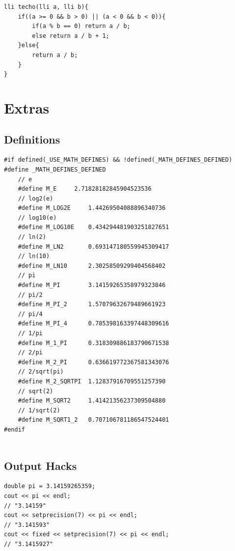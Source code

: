 \documentclass[twoside]{article}
\begin{document}
\begin{multicols*}{2}
\begin{verbatim}
\end{verbatim}
\vspace{-12pt}
\begin{verbatim}
lli techo(lli a, lli b){
	if((a >= 0 && b > 0) || (a < 0 && b < 0)){
		if(a % b == 0) return a / b;
		else return a / b + 1;
	}else{
		return a / b;
	}
}

\end{verbatim}

\sectionfont{\bfseries\sffamily\centering\Huge}
\vspace{1em}
\section*{Extras}
\vspace{3em}
\subsectionfont{\large\bfseries\sffamily\underline}
\subsection*{Definitions}
\begin{verbatim}
#if defined(_USE_MATH_DEFINES) && !defined(_MATH_DEFINES_DEFINED)
#define _MATH_DEFINES_DEFINED
	// e
	#define M_E		2.71828182845904523536
	// log2(e)
	#define M_LOG2E		1.44269504088896340736
	// log10(e)
	#define M_LOG10E	0.434294481903251827651
	// ln(2)
	#define M_LN2		0.693147180559945309417
	// ln(10)
	#define M_LN10		2.30258509299404568402
	// pi
	#define M_PI		3.14159265358979323846
	// pi/2
	#define M_PI_2		1.57079632679489661923
	// pi/4
	#define M_PI_4		0.785398163397448309616
	// 1/pi
	#define M_1_PI	 	0.318309886183790671538
	// 2/pi
	#define M_2_PI		0.636619772367581343076
	// 2/sqrt(pi)
	#define M_2_SQRTPI	1.12837916709551257390
	// sqrt(2)
	#define M_SQRT2		1.41421356237309504880
	// 1/sqrt(2)
	#define M_SQRT1_2	0.707106781186547524401
#endif


\end{verbatim}

\subsectionfont{\large\bfseries\sffamily\underline}
\subsection*{Output Hacks}
\begin{verbatim}
double pi = 3.14159265359;
cout << pi << endl;
// "3.14159"
cout << setprecision(7) << pi << endl;
// "3.141593"
cout << fixed << setprecision(7) << pi << endl;
// "3.1415927"


\end{verbatim}
\end{multicols*}
\end{document}
